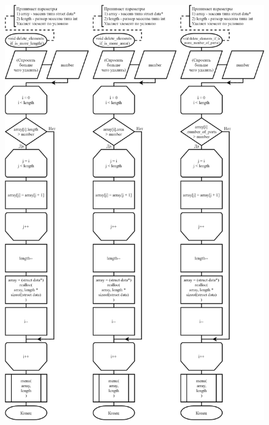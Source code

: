 \begin{figure}[!htp]
    \includegraphics[height=24cm]{../../Makefile-project/src/submenu/delete_by_condition/delete_by_condition-3.png}
\end{figure}

